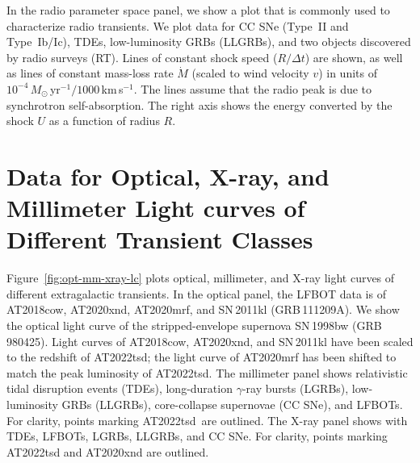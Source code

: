 \documentclass{nature_plusfigure}
\newcommand{\at}{AT2022tsd}
\begin{document}
\begin{methods}
In the radio parameter space panel, we show a plot that is commonly used to characterize radio transients\cite{Chevalier1998,Ho2019}.
We plot data for CC SNe (Type~II and Type~Ib/Ic), TDEs, low-luminosity GRBs (LLGRBs), and two objects discovered by radio surveys (RT\cite{Dong2021,Mooley2022}). Lines of constant shock speed ($R/\Delta t$) are shown, as well as lines of constant mass-loss rate $\dot{M}$ (scaled to wind velocity $v$) in units of $10^{-4}\,M_\odot$\,yr$^{-1}/1000\,$km\,s$^{-1}$. The lines assume that the radio peak is due to synchrotron self-absorption\cite{Chevalier1998}. The right axis\cite{Ho2019} shows the energy converted by the shock $U$ as a function of radius $R$.

\section{Data for Optical, X-ray, and Millimeter Light curves of Different Transient Classes}
\label{sec:data-transient-lc}


Figure~\ref{fig:opt-mm-xray-lc} plots optical, millimeter, and X-ray light curves of different extragalactic transients. In the optical panel, the LFBOT data is of AT2018cow\cite{Perley2019,Ho2019,RiveraSandoval2018,Margutti2019}, AT2020xnd\cite{Perley2021,Ho2022_AT2020xnd,Bright2022}, AT2020mrf\cite{Yao2022}, and SN\,2011kl\cite{Greiner2015} (GRB\,111209A). We show the optical light curve of the stripped-envelope supernova SN\,1998bw\cite{Galama1998} (GRB\,980425).
Light curves of AT2018cow, AT2020xnd, and SN\,2011kl have been scaled to the redshift of \at; the light curve of AT2020mrf has been shifted to match the peak luminosity of \at. The millimeter panel shows relativistic tidal disruption events (TDEs\cite{Zauderer2011,Yuan2016,Andreoni2022}), long-duration $\gamma$-ray bursts (LGRBs\cite{Sheth2003,Perley2014,Laskar2018,Laskar2019}), low-luminosity GRBs (LLGRBs\cite{Kulkarni1998,Perley2017}), core-collapse supernovae (CC SNe\cite{Weiler2007,Soderberg2010,Horesh2013,Corsi2014,Maeda2021}), and LFBOTs\cite{Ho2019,Ho2022_AT2020xnd}. For clarity, points marking \at\ are outlined. The X-ray panel shows  with TDEs\cite{Mangano2016,Andreoni2022}, LFBOTs\cite{RiveraSandoval2018,Margutti2019,Ho2019,Coppejans2020,Ho2022_AT2020xnd,Bright2022,Yao2022}, LGRBs\cite{Yao2022}, LLGRBs\cite{Kouveliotou2004,Tiengo2004,Campana2006,Soderberg2006,Margutti2013}, and CC SNe\cite{Dwarkadas2012}. For clarity, points marking AT2022tsd and AT2020xnd are outlined.


\end{methods}
\end{document}
